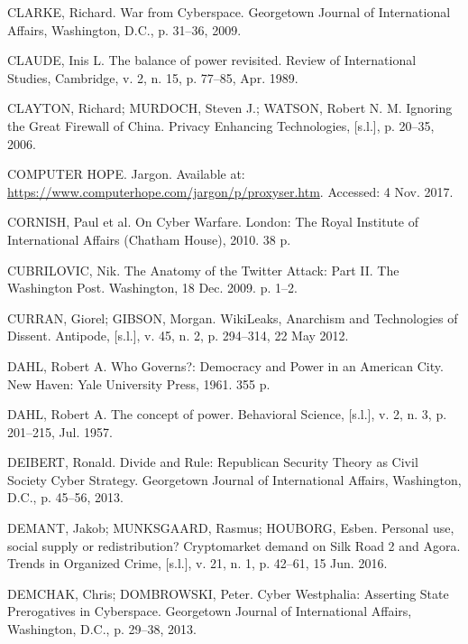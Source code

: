 \begin{list}{}{\setlength{\leftmargin}{0pt}\setlength{\itemsep}{6pt}\setlength{\parsep}{0pt}}
\item CLARKE, Richard. War from Cyberspace. Georgetown Journal of International Affairs, Washington, D.C., p. 31--36, 2009.

\item CLAUDE, Inis L. The balance of power revisited. Review of International Studies, Cambridge, v. 2, n. 15, p. 77--85, Apr. 1989.

\item CLAYTON, Richard; MURDOCH, Steven J.; WATSON, Robert N. M. Ignoring the Great Firewall of China. Privacy Enhancing Technologies, [s.l.], p. 20--35, 2006.

\item COMPUTER HOPE. Jargon. Available at: \url{https://www.computerhope.com/jargon/p/proxyser.htm}. Accessed: 4 Nov. 2017.

\item CORNISH, Paul et al. On Cyber Warfare. London: The Royal Institute of International Affairs (Chatham House), 2010. 38 p.

\item CUBRILOVIC, Nik. The Anatomy of the Twitter Attack: Part II. The Washington Post. Washington, 18 Dec. 2009. p. 1--2.

\item CURRAN, Giorel; GIBSON, Morgan. WikiLeaks, Anarchism and Technologies of Dissent. Antipode, [s.l.], v. 45, n. 2, p. 294--314, 22 May 2012.

\item DAHL, Robert A. Who Governs?: Democracy and Power in an American City. New Haven: Yale University Press, 1961. 355 p.

\item DAHL, Robert A. The concept of power. Behavioral Science, [s.l.], v. 2, n. 3, p. 201--215, Jul. 1957.

\item DEIBERT, Ronald. Divide and Rule: Republican Security Theory as Civil Society Cyber Strategy. Georgetown Journal of International Affairs, Washington, D.C., p. 45--56, 2013.

\item DEMANT, Jakob; MUNKSGAARD, Rasmus; HOUBORG, Esben. Personal use, social supply or redistribution? Cryptomarket demand on Silk Road 2 and Agora. Trends in Organized Crime, [s.l.], v. 21, n. 1, p. 42--61, 15 Jun. 2016.

\item DEMCHAK, Chris; DOMBROWSKI, Peter. Cyber Westphalia: Asserting State Prerogatives in Cyberspace. Georgetown Journal of International Affairs, Washington, D.C., p. 29--38, 2013.


\end{list}
